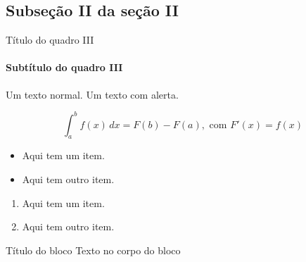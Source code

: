 \documentclass[aspectratio=169]{beamer}
\begin{document}
	\subsection{Subseção II da seção II}
	\begin{frame}{Título do quadro III}
		\framesubtitle{Subtítulo do quadro III}
		
		Um texto normal. \alert{Um texto com alerta.}
		
		$$\int_a^b f(x)\, dx= F(b) - F(a), \text{ com } F'(x) = f(x)$$
		
		\begin{itemize}
			\item Aqui tem um item.
			\item Aqui tem outro item.
		\end{itemize}
		
		\begin{enumerate}
			\item Aqui tem um item.
			\item Aqui tem outro item.
		\end{enumerate}
		
		\begin{block}{Título do bloco}
			Texto no corpo do bloco
		\end{block}
	\end{frame}
\end{document}
